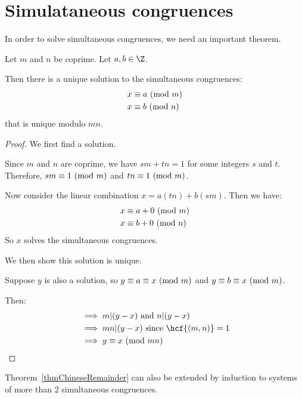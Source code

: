 \documentclass[../Main.tex]{subfiles}
\begin{document}
\section{Simulataneous congruences}
In order to solve simultaneous congruences, we need an important theorem.
\begin{theorem}
    Let $m$ and $n$ be coprime. Let $a, b \in \Z$.\par
    Then there is a unique solution to the simultaneous congruences:
    \begin{align*}
        &x \equiv a~(\text{mod}~{m}) \\
        &x \equiv b~(\text{mod}~{n}) \\
    \end{align*}
    that is unique modulo $mn$.
    \label{thmChineseRemainder}
\end{theorem}
\begin{proof}
    We first find a solution.\par
    Since $m$ and $n$ are coprime, we have $s m + t n = 1$ for some integers $s$ and $t$. Therefore, $sm \equiv 1~(\text{mod}~{m})$ and $tn \equiv 1~(\text{mod}~{m})$.\par
    Now consider the linear combination $x = a(tn) + b(sm)$. Then we have:
    \begin{align*}
        &x \equiv a + 0~(\text{mod}~{m}) \\
        &x \equiv b + 0~(\text{mod}~{n}) 
    \end{align*}
    So $x$ solves the simultaneous congruences.\par
    We then show this solution is unique.\par
    Suppose $y$ is also a solution, so $y \equiv a \equiv x~(\text{mod}~{m})$ and $y \equiv b \equiv x~(\text{mod}~{m})$.\par
    Then:
    \begin{align*}
        &\implies m | (y - x) \text{ and } n | (y - x) \\
        &\implies mn | (y - x) \text{ since } \hcf{(m, n)} = 1 \\
        &\implies \congruence{y}{x}{mn}
    \end{align*}
\end{proof}
\begin{remark}
    Theorem~\ref{thmChineseRemainder} can also be extended by induction to systems of more than 2 simultaneous congruences.
\end{remark}
\end{document}
